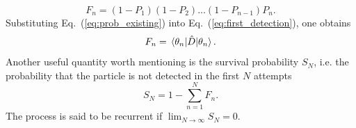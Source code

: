 \documentclass[12pt]{article}
\numberwithin{equation}{section}
\newcommand{\1}{\mathbb{1}}
\begin{document}
\begin{equation}\label{eq:first_detection}
    F_n=(1-P_1)(1-P_2)...(1-P_{n-1})P_n.
\end{equation}
Substituting Eq.~(\ref{eq:prob_existing}) into Eq.~(\ref{eq:first_detection}), one obtains
\begin{equation}
    F_n=\ev{\hat{D}}{\theta_n}.
\end{equation}
Another useful quantity worth mentioning is the survival probability $S_N$, i.e. the probability that the particle is not detected in the first $N$ attempts
\begin{equation}
    S_N=1-\sum_{n=1}^NF_n.
\end{equation}
The process is said to be recurrent if $\lim_{N\to\infty}S_N=0$.
\end{document}
